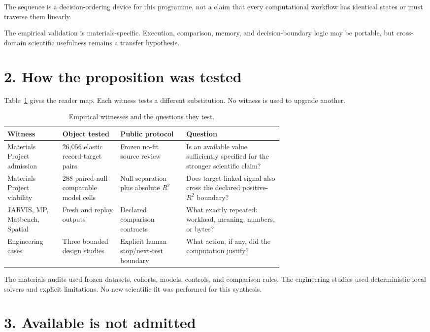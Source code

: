 \documentclass[10pt,a4paper]{article}
\begin{document}
The sequence is a decision-ordering device for this programme, not a claim that every computational workflow has identical states or must traverse them linearly.

The empirical validation is materials-specific. Execution, comparison, memory, and decision-boundary logic may be portable, but cross-domain scientific usefulness remains a transfer hypothesis.

\section{2. How the proposition was tested}
Table~\ref{tab:witnesses} gives the reader map. Each witness tests a different substitution. No witness is used to upgrade another.

\begin{table}[htbp]\centering\small
\caption{Empirical witnesses and the questions they test.}\label{tab:witnesses}
\begin{tabularx}{\linewidth}{@{}p{0.20\linewidth}p{0.21\linewidth}p{0.24\linewidth}X@{}}\toprule
Witness & Object tested & Public protocol & Question\\\midrule
Materials Project admission & 26,056 elastic record-target pairs & Frozen no-fit source review & Is an available value sufficiently specified for the stronger scientific claim?\\
Materials Project viability & 288 paired-null-comparable model cells & Null separation plus absolute $R^2$ & Does target-linked signal also cross the declared positive-$R^2$ boundary?\\
JARVIS, MP, Matbench, Spatial & Fresh and replay outputs & Declared comparison contracts & What exactly repeated: workload, meaning, numbers, or bytes?\\
Engineering cases & Three bounded design studies & Explicit human stop/next-test boundary & What action, if any, did the computation justify?\\\bottomrule
\end{tabularx}\end{table}

The materials audits used frozen datasets, cohorts, models, controls, and comparison rules. The engineering studies used deterministic local solvers and explicit limitations. No new scientific fit was performed for this synthesis.

\section{3. Available is not admitted}
\end{document}
